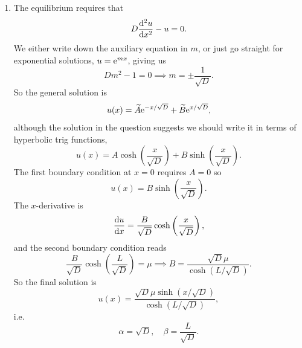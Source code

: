 \documentclass[a4paper,12pt]{article}
\begin{document}
\begin{enumerate}
{\begin{enumerate}
        \item %
          The equilibrium requires that
          \begin{equation}
            D\fdd{u}{x}- u = 0.
          \end{equation}
          We either write down the auxiliary equation in $m$, or just go straight for exponential solutions, $u = \mathrm{e}^{mx}$, giving us
          \begin{equation}
            Dm^2 - 1 = 0 \implies m = \pm\frac{1}{\sqrt{D}}.
          \end{equation}
          So the general solution is
          \begin{equation}
            u(x) = \widetilde{A} \mathrm{e}^{-{x}/{\sqrt{D}}} + \widetilde{B} \mathrm{e}^{{x}/{\sqrt{D}}},
          \end{equation}
          although the solution in the question suggests we should write it in terms of hyperbolic trig functions,
          \begin{equation}
            u(x) = A \cosh\left(\frac{x}{\sqrt{D}}\right) + B \sinh\left(\frac{x}{\sqrt{D}}\right).
          \end{equation}
          The first boundary condition at $x=0$ requires $A=0$ so
          \begin{equation}
            u(x) =B\sinh\left(\frac{x}{\sqrt{D}}\right).
          \end{equation}
          The $x$-derivative is
          \begin{equation}
            \fd{u}{x} = \frac{B}{\sqrt{D}}\cosh\left(\frac{x}{\sqrt{D}}\right),
          \end{equation}
          and the second boundary condition reads
          \begin{equation}
            \frac{B}{\sqrt{D}}\cosh\left(\frac{L}{\sqrt{D}}\right) = \mu \implies B = \frac{\sqrt D \mu}{\cosh(L/\sqrt{D})}.
          \end{equation}
          So the final solution is
          \begin{equation}
            u(x) =\frac{\sqrt{D}\mu\sinh(x/\sqrt{D})}{\cosh(L/\sqrt{D})},
          \end{equation}
          i.e.
          \begin{equation}
            \alpha = \sqrt{D}, \quad \beta = \frac{L}{\sqrt{D}}.
          \end{equation}


\end{enumerate}}
\end{enumerate}
\end{document}
